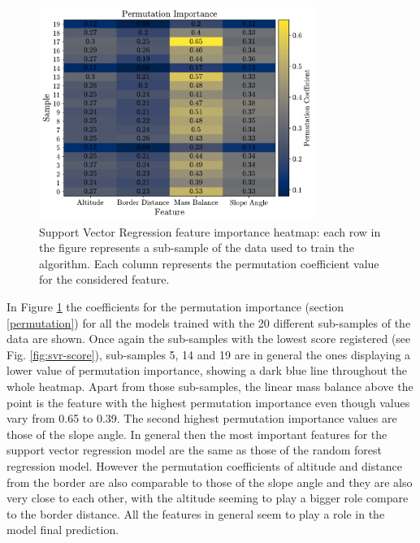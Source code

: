 \begin{figure}[!tp]
	\centering		  
	\includegraphics[width=0.8\textwidth]{figures/SVR_heatmap.pdf}
	\caption{Support Vector Regression feature importance heatmap: each row in the figure represents a sub-sample of the data used to train the algorithm. Each column represents the permutation coefficient value for the considered feature.}
	\label{fig:svr-heatmap}
\end{figure}

In Figure \ref{fig:svr-heatmap} the coefficients for the permutation importance (section \ref{permutation}) for all the models trained with the 20 different sub-samples of the data are shown. Once again the sub-samples with the lowest score registered (see Fig. \ref{fig:svr-score}), sub-samples 5, 14 and 19 are in general the ones displaying a lower value of permutation importance, showing a dark blue line throughout the whole heatmap. Apart from those sub-samples, the linear mass balance above the point is the feature with the highest permutation importance even though values vary from 0.65 to 0.39. The second highest permutation importance values are those of the slope angle. In general then the most important features for the support vector regression model are the same as those of the random forest regression model. However the permutation coefficients of altitude and distance from the border are also comparable to those of the slope angle and they are also very close to each other, with the altitude seeming to play a bigger role compare to the border distance. All the features in general seem to play a role in the model final prediction. 

